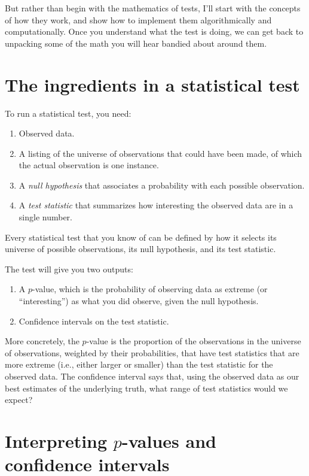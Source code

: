 But rather than begin with the mathematics of tests, I'll start with the concepts of how they work, and show how to implement them algorithmically and computationally. Once you understand what the test is doing, we can get back to unpacking some of the math you will hear bandied about around them.

\section{The ingredients in a statistical test}

To run a statistical test, you need:

\begin{enumerate}
\item Observed data.
\item A listing of the universe of observations that could have been made, of which the actual observation is one instance.
\item A \emph{null hypothesis} that associates a probability with each possible observation.
\item A \emph{test statistic} that summarizes how interesting the observed data are in a single number.
\end{enumerate}

Every statistical test that you know of can be defined by how it selects its
universe of possible observations, its null hypothesis, and its test statistic.

The test will give you two outputs:

\begin{enumerate}
\item A $p$-value, which is the probability of observing data as extreme (or ``interesting'') as what you did observe, given the null hypothesis.
\item Confidence intervals on the test statistic.
\end{enumerate}

More concretely, the $p$-value is the proportion of the observations in the universe of observations, weighted by their probabilities, that have test statistics that are more extreme (i.e., either larger or smaller) than the test statistic for the observed data. The confidence interval says that, using the observed data as our best estimates of the underlying truth, what range of test statistics would we expect?

\section{Interpreting $p$-values and confidence intervals}

